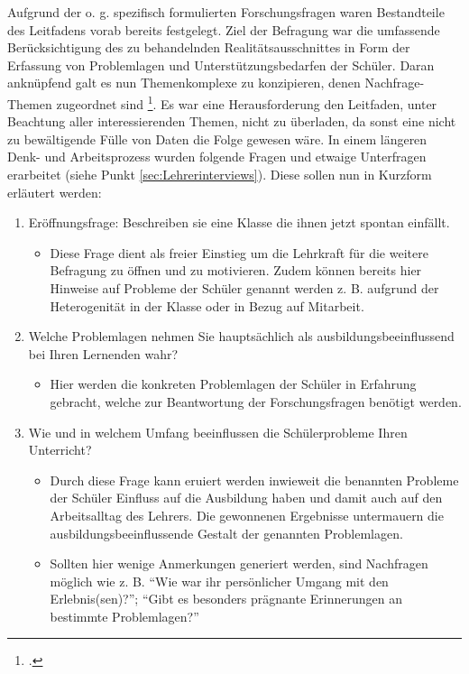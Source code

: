 Aufgrund der o. g. spezifisch formulierten Forschungsfragen waren Bestandteile des Leitfadens vorab bereits festgelegt. Ziel der Befragung war die umfassende Berücksichtigung des zu behandelnden Realitätsausschnittes in Form der Erfassung von Problemlagen und Unterstützungsbedarfen der Schüler. Daran anknüpfend galt es nun Themenkomplexe zu konzipieren, denen Nachfrage-Themen zugeordnet sind \footcite[vgl.][45]{Mayer2013}. Es war eine Herausforderung den Leitfaden, unter Beachtung aller interessierenden Themen, nicht zu überladen, da sonst eine nicht zu bewältigende Fülle von Daten die Folge gewesen wäre. In einem längeren Denk- und Arbeitsprozess wurden folgende Fragen und etwaige Unterfragen erarbeitet (siehe Punkt \ref{sec:Lehrerinterviews}). Diese sollen nun in Kurzform erläutert werden:

\begin{enumerate}
	\item Eröffnungsfrage: Beschreiben sie eine Klasse die ihnen jetzt spontan einfällt.
	\begin{itemize}
		\item Diese Frage dient als freier Einstieg um die Lehrkraft für die weitere Befragung zu öffnen und zu motivieren. Zudem können bereits hier Hinweise auf Probleme der Schüler genannt werden z. B. aufgrund der Heterogenität in der Klasse oder in Bezug auf Mitarbeit.
	\end{itemize}
	\item Welche Problemlagen nehmen Sie hauptsächlich als ausbildungsbeeinflussend bei Ihren Lernenden wahr?
	\begin{itemize}
		\item Hier werden die konkreten Problemlagen der Schüler in Erfahrung gebracht, welche zur Beantwortung der Forschungsfragen benötigt werden.
	\end{itemize}
	\item Wie und in welchem Umfang beeinflussen die Schülerprobleme Ihren Unterricht?
	\begin{itemize}
		\item Durch diese Frage kann eruiert werden inwieweit die benannten Probleme der Schüler Einfluss auf die Ausbildung haben und damit auch auf den Arbeitsalltag des Lehrers. Die gewonnenen Ergebnisse untermauern die ausbildungsbeeinflussende Gestalt der genannten Problemlagen.
		\item Sollten hier wenige Anmerkungen generiert werden, sind Nachfragen möglich wie z. B. "`Wie war ihr persönlicher Umgang mit den Erlebnis(sen)?"'; "`Gibt es besonders prägnante Erinnerungen an bestimmte Problemlagen?"'

\end{itemize}
\end{enumerate}

